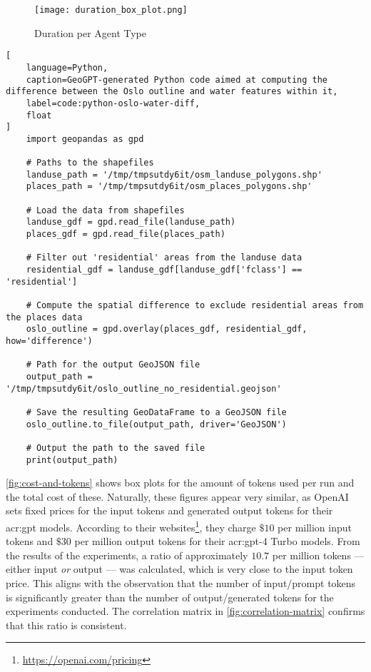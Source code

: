 \begin{figure}[htbp]
    \centering
    \texttt{[image: duration\_box\_plot.png]}
    \caption{Duration per Agent Type}
    \label{fig:duration-box-plot}
\end{figure}

\FloatBarrier

\begin{lstlisting}[
    language=Python,
    caption=GeoGPT-generated Python code aimed at computing the difference between the Oslo outline and water features within it,
    label=code:python-oslo-water-diff,
    float
]
    import geopandas as gpd

    # Paths to the shapefiles
    landuse_path = '/tmp/tmpsutdy6it/osm_landuse_polygons.shp'
    places_path = '/tmp/tmpsutdy6it/osm_places_polygons.shp'
    
    # Load the data from shapefiles
    landuse_gdf = gpd.read_file(landuse_path)
    places_gdf = gpd.read_file(places_path)
    
    # Filter out 'residential' areas from the landuse data
    residential_gdf = landuse_gdf[landuse_gdf['fclass'] == 'residential']
     
    # Compute the spatial difference to exclude residential areas from the places data
    oslo_outline = gpd.overlay(places_gdf, residential_gdf, how='difference')
    
    # Path for the output GeoJSON file
    output_path = '/tmp/tmpsutdy6it/oslo_outline_no_residential.geojson'
    
    # Save the resulting GeoDataFrame to a GeoJSON file
    oslo_outline.to_file(output_path, driver='GeoJSON')
    
    # Output the path to the saved file
    print(output_path)    
\end{lstlisting}

\autoref{fig:cost-and-tokens} shows box plots for the amount of tokens used per run and the total cost of these. Naturally, these figures appear very similar, as OpenAI sets fixed prices for the input tokens and generated output tokens for their \acrshort{acr:gpt} models. According to their websites\footnote{\url{https://openai.com/pricing}}, they charge $\$10$ per million input tokens and $\$30$ per million output tokens for their \acrshort{acr:gpt}-4 Turbo models. From the results of the experiments, a ratio of approximately $10.7$ per million tokens --- either input \textit{or} output --- was calculated, which is very close to the input token price. This aligns with the observation that the number of input/prompt tokens is significantly greater than the number of output/generated tokens for the experiments conducted. The correlation matrix in \autoref{fig:correlation-matrix} confirms that this ratio is consistent.

